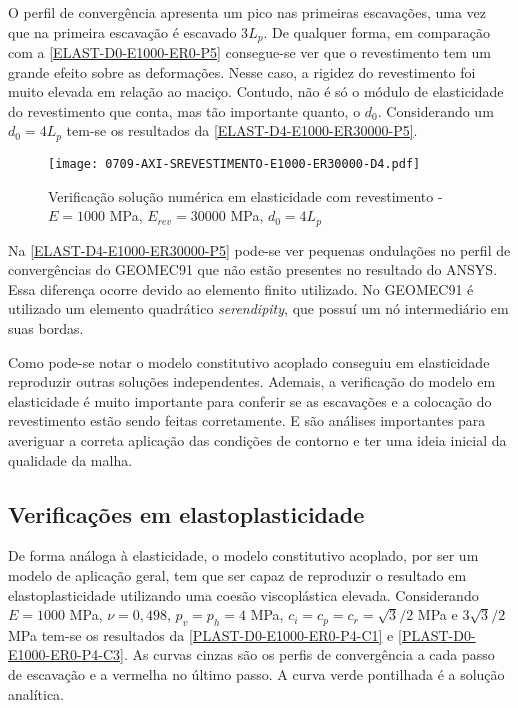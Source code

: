O perfil de convergência apresenta um pico nas primeiras escavações, uma vez que na primeira escavação é escavado 3$L_p$. De qualquer forma, em comparação com a \autoref{ELAST-D0-E1000-ER0-P5} consegue-se ver que o revestimento tem um grande efeito sobre as deformações. Nesse caso, a rigidez do revestimento foi muito elevada em relação ao maciço. Contudo, não é só o módulo de elasticidade do revestimento que conta, mas tão importante quanto, o $d_0$. Considerando um $d_0=4L_p$ tem-se os resultados da \autoref{ELAST-D4-E1000-ER30000-P5}.

\begin{figure}[H]
	\begin{center}
		\texttt{[image: 0709-AXI-SREVESTIMENTO-E1000-ER30000-D4.pdf]}
	\end{center}
	\caption{\label{ELAST-D4-E1000-ER30000-P5}Verificação solução numérica em elasticidade com revestimento - $E = 1000$ MPa, $E_{rev} = 30000$ MPa, $d_0 = 4L_p$}
\end{figure}

Na \autoref{ELAST-D4-E1000-ER30000-P5} pode-se ver pequenas ondulações no perfil de convergências do GEOMEC91 que não estão presentes no resultado do ANSYS. Essa diferença ocorre devido ao elemento finito utilizado. No GEOMEC91 é utilizado um elemento quadrático \textit{serendipity}, que possuí um nó intermediário em suas bordas.

Como pode-se notar o modelo constitutivo acoplado conseguiu em elasticidade reproduzir outras soluções independentes. Ademais, a verificação do modelo em elasticidade é muito importante para conferir se as escavações e a colocação do revestimento estão sendo feitas corretamente. E são análises importantes para averiguar a correta aplicação das condições de contorno e ter uma ideia inicial da qualidade da malha.

\subsection{Verificações em elastoplasticidade}

De forma análoga à elasticidade, o modelo constitutivo acoplado, por ser um modelo de aplicação geral, tem que ser capaz de reproduzir o resultado em elastoplasticidade utilizando uma coesão viscoplástica elevada. Considerando $E =1000$ MPa, $\nu =0,498$, $p_v = p_h = 4$ MPa, $c_i=c_p=c_r = \sqrt{3}/2$ MPa e $3\sqrt{3}/2$ MPa  tem-se os resultados da \autoref{PLAST-D0-E1000-ER0-P4-C1} e \autoref{PLAST-D0-E1000-ER0-P4-C3}. As curvas cinzas são os perfis de convergência a cada passo de escavação e a vermelha no último passo. A curva verde pontilhada é a solução analítica.

